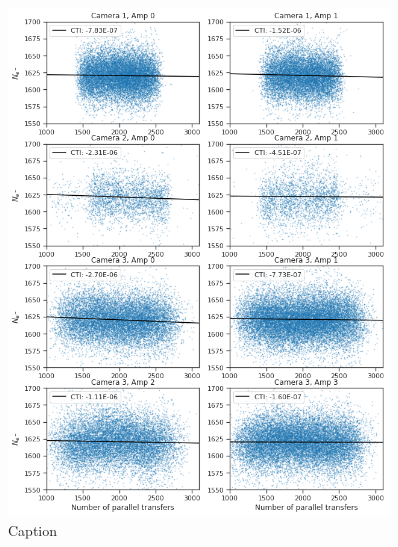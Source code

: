 \begin{figure}
    \centering
    \includegraphics[width=0.9\textwidth]{figures/chap2/xray_cte_parallel.png}
    \caption{Caption}
    \label{fig:cte_xray}
\end{figure}

